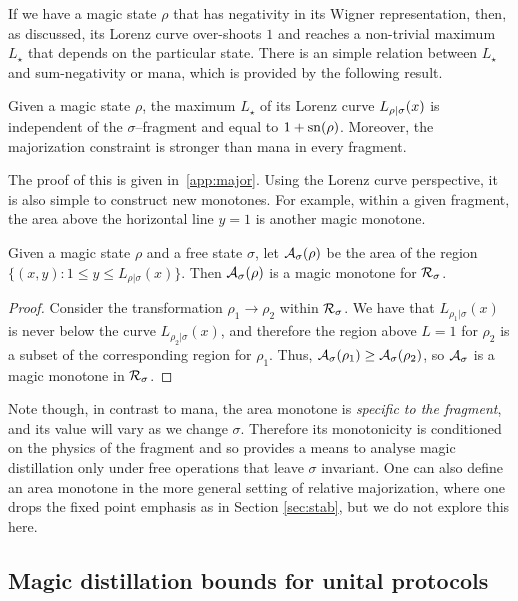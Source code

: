 \documentclass[pra,
aps,
twocolumn,
superscriptaddress,
groupedaddress,
nofootinbib,
reprint
]{revtex4-1}
\begin{document}
If we have a magic state $\rho$ that has negativity in its Wigner representation, then, as discussed, its Lorenz curve over-shoots $1$ and reaches a non-trivial maximum $L_\star$ that depends on the particular state. There is an simple relation between $L_\star$ and sum-negativity or mana, which is provided by the following result. 
\begin{theorem}\label{lem:lcmax}
	Given a magic state $\rho$, the maximum $L_\star$ of its Lorenz curve ${L_{\rho|\sigma}}(x)$ is independent of the $\sigma$--fragment and equal to $1+{{\rm{sn}}(\rho)}$. Moreover, the majorization constraint is stronger than mana in every fragment.
\end{theorem}
The proof of this is given in~\cref{app:major}. Using the Lorenz curve perspective, it is also simple to construct new monotones. For example, within a given fragment, the area above the horizontal line $y = 1$ is another magic monotone.
\begin{lemma}
Given a magic state $\rho$ and a free state $\sigma$, let ${\mathcal A}_\sigma(\rho)$ be the area of the region $\{(x, y): 1 \leq y \leq L_{\rho | \sigma}(x)\}$. Then ${\mathcal A}_\sigma(\rho)$ is a magic monotone for ${\mathcal R}_\sigma$.
\end{lemma}
\begin{proof}
Consider the transformation $\rho_1 \rightarrow \rho_2$ within ${\mathcal R}_\sigma$. We have that $L_{\rho_1|\sigma}(x)$ is never below the curve $L_{\rho_2|\sigma}(x)$, and therefore the region above $L=1$ for $\rho_2$ is a subset of the corresponding region for $\rho_1$. Thus, ${\mathcal A}_\sigma(\rho_1) \geq {\mathcal A}_\sigma(\rho_2)$, so ${\mathcal A}_\sigma$ is a magic monotone in ${\mathcal R}_\sigma$.
\end{proof}
Note though, in contrast to mana, the area monotone is \emph{specific to the fragment}, and its value will vary as we change $\sigma$. Therefore its monotonicity is conditioned on the physics of the fragment and so provides a means to analyse magic distillation only under free operations that leave $\sigma$ invariant. One can also define an area monotone in the more general setting of relative majorization, where one drops the fixed point emphasis as in Section \ref{sec:stab}, but we do not explore this here.

\subsection{Magic distillation bounds for unital protocols}
\label{sec:unital}
\end{document}
